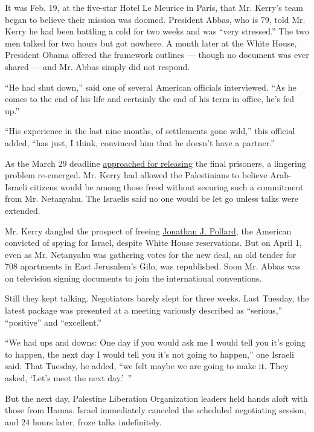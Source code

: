 It was Feb. 19, at the five-star Hotel Le Meurice in Paris, that Mr.
Kerry's team began to believe their mission was doomed. President Abbas,
who is 79, told Mr. Kerry he had been battling a cold for two weeks and
was ``very stressed.'' The two men talked for two hours but got nowhere.
A month later at the White House, President Obama offered the framework
outlines --- though no document was ever shared --- and Mr. Abbas simply
did not respond.

``He had shut down,'' said one of several American officials
interviewed. ``As he comes to the end of his life and certainly the end
of his term in office, he's fed up.''

``His experience in the last nine months, of settlements gone wild,''
this official added, ``has just, I think, convinced him that he doesn't
have a partner.''

As the March 29 deadline
\href{http://www.nytimes3xbfgragh.onion/2014/03/24/world/middleeast/standoff-over-prisoner-release-threatens-mideast-talks.html}{approached
for releasing} the final prisoners, a lingering problem re-emerged. Mr.
Kerry had allowed the Palestinians to believe Arab-Israeli citizens
would be among those freed without securing such a commitment from Mr.
Netanyahu. The Israelis said no one would be let go unless talks were
extended.

Mr. Kerry dangled the prospect of freeing
\href{http://www.nytimes3xbfgragh.onion/2014/04/01/world/middleeast/pollard.html}{Jonathan
J. Pollard}, the American convicted of spying for Israel, despite White
House reservations. But on April 1, even as Mr. Netanyahu was gathering
votes for the new deal, an old tender for 708 apartments in East
Jerusalem's Gilo, was republished. Soon Mr. Abbas was on television
signing documents to join the international conventions.

Still they kept talking. Negotiators barely slept for three weeks. Last
Tuesday, the latest package was presented at a meeting variously
described as ``serious,'' ``positive'' and ``excellent.''

``We had ups and downs: One day if you would ask me I would tell you
it's going to happen, the next day I would tell you it's not going to
happen,'' one Israeli said. That Tuesday, he added, ``we felt maybe we
are going to make it. They asked, `Let's meet the next day.'~''

But the next day, Palestine Liberation Organization leaders held hands
aloft with those from Hamas. Israel immediately canceled the scheduled
negotiating session, and 24 hours later, froze talks indefinitely.

